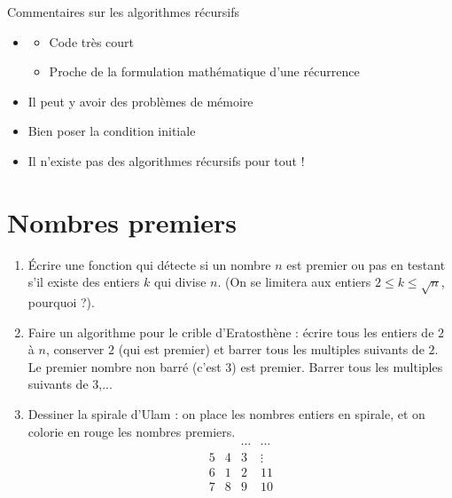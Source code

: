 \begin{frame}

Commentaires sur les algorithmes récursifs
\pause
\begin{itemize}
  \item 
  \begin{itemize}
    \item Code très court
\pause
    \item Proche de la formulation mathématique d'une récurrence
  \end{itemize}
 \pause 
  
  \item Il peut y avoir des problèmes de mémoire
 \pause 
  
  \item Bien poser la condition initiale
 \pause 
  \item Il n'existe pas des algorithmes récursifs pour tout !
\end{itemize}

\end{frame}


\section{Nombres premiers}


\begin{frame}

\begin{tp}
\begin{enumerate}
  \item \'Ecrire une fonction qui détecte si un nombre $n$ est premier ou pas en testant s'il existe des entiers 
  $k$ qui divise $n$. (On se limitera aux entiers $2 \le k \le \sqrt{n}$, pourquoi ?).
  \item Faire un algorithme pour le crible d'Eratosthène : écrire tous les entiers de $2$ à $n$,
  conserver $2$ (qui est premier) et barrer tous les multiples suivants de $2$. Le premier nombre non barré (c'est $3$) est premier.
  Barrer tous les multiples suivants de $3$,...
  \item Dessiner la spirale d'Ulam : on place les nombres entiers en spirale, et on colorie en rouge les nombres premiers.
  $$\begin{matrix} & & \cdots & \cdots \\ 5 & 4 & 3 & \vdots \\ 6 & 1 & 2 & 11 \\ 7 & 8 & 9 & 10 \\\end{matrix}$$
\end{enumerate}  
\end{tp}

\end{frame}

